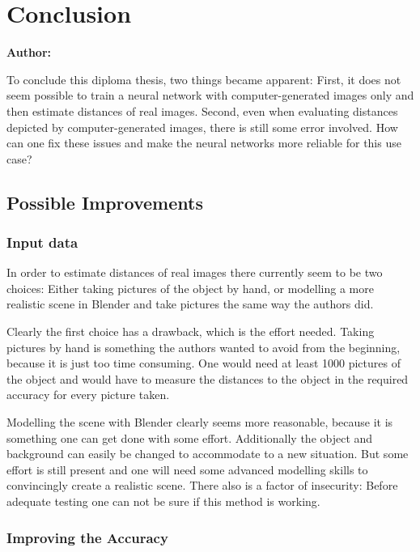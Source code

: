 \chapter{Conclusion}

\textbf{Author: } 

To conclude this diploma thesis, two things became apparent: First, it does not seem possible to train a neural network with computer-generated images only and then estimate distances of real images. Second, even when evaluating distances depicted by computer-generated images, there is still some error involved. How can one fix these issues and make the neural networks more reliable for this use case?

\section{Possible Improvements}

\subsection{Input data}

In order to estimate distances of real images there currently seem to be two choices: Either taking pictures of the object by hand, or modelling a more realistic scene in Blender and take pictures the same way the authors did.

Clearly the first choice has a drawback, which is the effort needed. Taking pictures by hand is something the authors wanted to avoid from the beginning, because it is just too time consuming. One would need at least 1000 pictures of the object and would have to measure the distances to the object in the required accuracy for every picture taken.

Modelling the scene with Blender clearly seems more reasonable, because it is something one can get done with some effort. Additionally the object and background can easily be changed to accommodate to a new situation. But some effort is still present and one will need some advanced modelling skills to convincingly create a realistic scene. There also is a factor of insecurity: Before adequate testing one can not be sure if this method is working.

\subsection{Improving the Accuracy}

